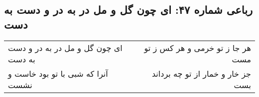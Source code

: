 \begin{center}
\section*{رباعی شماره ۴۷: ای چون گل و مل در به در و دست به دست}
\label{sec:sh047}
\begin{longtable}{l p{0.5cm} r}
ای چون گل و مل در به در و دست به دست
&&
هر جا ز تو خرمی و هر کس ز تو مست
\\
آنرا که شبی با تو بود خاست و نشست
&&
جز خار و خمار از تو چه برداند بست
\\
\end{longtable}
\end{center}
